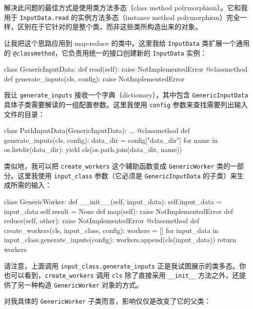 解决此问题的最佳方式是使用类方法多态（class method polymorphism）。它和我用于 \texttt{InputData.read} 的实例方法多态（instance method polymorphism）完全一样，区别在于它针对的是整个类，而非这些类所构造出来的对象。

让我把这个思路应用到 map-reduce 的类中。这里我给 \texttt{InputData} 类扩展一个通用的 \texttt{@classmethod}，它负责用统一的接口创建新的 \texttt{InputData} 实例：

\begin{codebox}[python]
class GenericInputData:
    def read(self):
        raise NotImplementedError
    @classmethod
    def generate_inputs(cls, config):
        raise NotImplementedError
\end{codebox}

我让 \texttt{generate\_inputs} 接收一个字典（dictionary），其中包含 \texttt{GenericInputData} 具体子类需要解读的一组配置参数。这里我使用 \texttt{config} 参数来查找需要列出输入文件的目录：

\begin{codebox}[python]
class PathInputData(GenericInputData):
    ...
    @classmethod
    def generate_inputs(cls, config):
        data_dir = config["data_dir"]
        for name in os.listdir(data_dir):
            yield cls(os.path.join(data_dir, name))
\end{codebox}

类似地，我可以把 \texttt{create\_workers} 这个辅助函数变成 \texttt{GenericWorker} 类的一部分。这里我使用 \texttt{input\_class} 参数（它必须是 \texttt{GenericInputData} 的子类）来生成所需的输入：

\begin{codebox}[python]
class GenericWorker:
    def __init__(self, input_data):
        self.input_data = input_data
        self.result = None
    def map(self):
        raise NotImplementedError
    def reduce(self, other):
        raise NotImplementedError
    @classmethod
    def create_workers(cls, input_class, config):
        workers = []
        for input_data in input_class.generate_inputs(config):
            workers.append(cls(input_data))
        return workers
\end{codebox}

请注意，上面调用 \texttt{input\_class.generate\_inputs} 正是我试图展示的类多态。你也可以看到，\texttt{create\_workers} 调用 \texttt{cls} 除了直接采用 \texttt{\_\_init\_\_} 方法之外，还提供了另一种构造 \texttt{GenericWorker} 对象的方式。

对我具体的 \texttt{GenericWorker} 子类而言，影响仅仅是改变了它的父类：

